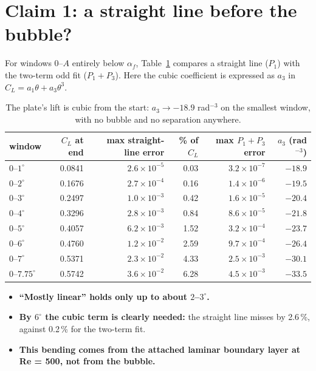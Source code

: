 \documentclass[11pt,a4paper]{article}
\newcommand{\CL}{C_L}
\newcommand{\af}{\alpha_f}
\begin{document}
\section{Claim 1: a straight line before the bubble?}

For windows $0$--$A$ entirely below $\af$, Table~\ref{tab:c1} compares a straight line ($P_1$)
with the two-term odd fit ($P_1+P_3$). Here the cubic coefficient is expressed as $a_3$ in
$\CL = a_1\theta + a_3\theta^3$.

\begin{table}[h]
\centering\small
\begin{tabular}{lrrrrr}
\toprule
window & $\CL$ at end & max straight-line error & \% of $\CL$ & max $P_1{+}P_3$ error & $a_3$ (rad$^{-3}$) \\
\midrule
$0$--$1^\circ$ & 0.0841 & $2.6\times10^{-5}$ & 0.03 & $3.2\times10^{-7}$ & $-18.9$ \\
$0$--$2^\circ$ & 0.1676 & $2.7\times10^{-4}$ & 0.16 & $1.4\times10^{-6}$ & $-19.5$ \\
$0$--$3^\circ$ & 0.2497 & $1.0\times10^{-3}$ & 0.42 & $1.6\times10^{-5}$ & $-20.4$ \\
$0$--$4^\circ$ & 0.3296 & $2.8\times10^{-3}$ & 0.84 & $8.6\times10^{-5}$ & $-21.8$ \\
$0$--$5^\circ$ & 0.4057 & $6.2\times10^{-3}$ & 1.52 & $3.2\times10^{-4}$ & $-23.7$ \\
$0$--$6^\circ$ & 0.4760 & $1.2\times10^{-2}$ & 2.59 & $9.7\times10^{-4}$ & $-26.4$ \\
$0$--$7^\circ$ & 0.5371 & $2.3\times10^{-2}$ & 4.33 & $2.5\times10^{-3}$ & $-30.1$ \\
$0$--$7.75^\circ$ & 0.5742 & $3.6\times10^{-2}$ & 6.28 & $4.5\times10^{-3}$ & $-33.5$ \\
\bottomrule
\end{tabular}
\caption{The plate's lift is cubic from the start: $a_3 \to -18.9$ rad$^{-3}$ on the smallest
window, with no bubble and no separation anywhere.}
\label{tab:c1}
\end{table}

\begin{itemize}[leftmargin=*]
\item \textbf{``Mostly linear'' holds only up to about $2$--$3^\circ$.}
\item \textbf{By $6^\circ$ the cubic term is clearly needed:} the straight line misses by
  2.6\,\%, against 0.2\,\% for the two-term fit.
\item \textbf{This bending comes from the attached laminar boundary layer at Re = 500, not from
  the bubble.}
\end{itemize}
\end{document}
